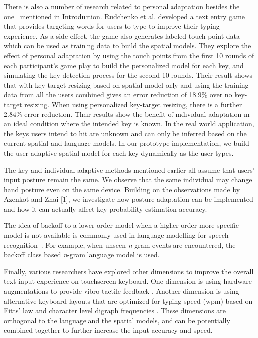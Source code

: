\documentclass{sigchi}
\begin{document}
There is also a number of research related to personal adaptation besides the one~\cite{Findlater:2012} mentioned in Introduction. 
Rudchenko et al. \cite{Rudchenko:2011}
developed a text entry game that provides 
targeting words for users to type to improve their typing experience. As a side effect,
the game also generates labeled touch point data which can be used as
training data to build the spatial models. They explore the effect of personal adaptation
by using the touch points from the first 10 rounds of each 
participant's game play to build the personalized model for each key, and simulating the key detection
process for the second 10 rounds. Their result shows that with key-target resizing based on
spatial model only and using the training data from all the users combined
gives an error reduction of 18.9\% over no key-target resizing. When using personalized
key-target resizing, there is a further 2.84\% error reduction.
Their results show the benefit of individual adaptation in an ideal condition where the 
intended key is known. In the real world application, the keys users intend to hit are unknown and can only be inferred based on the current spatial and language models. In our prototype implementation, we build the user adaptive spatial model for each key dynamically as the user types. 

The key and individual adaptive methods mentioned earlier all assume that users' input posture
remain the same. We observe that the same individual may change hand posture even on the same device. Building on the observations made by Azenkot and Zhai [1], we investigate how posture adaptation can be implemented and how it can actually affect key probability estimation accuracy.

The idea of backoff to a lower order model when a higher order more specific model is not available is commonly used in language modelling for speech recognition~\cite{Zitouni:2007}. For example, when unseen \textit{n}-gram events are encountered, the backoff class based \textit{n}-gram language model is used.

Finally, various researchers have explored other dimensions to improve the overall
text input experience on touchscreen keyboard. One dimension is using hardware
augmentations to provide vibro-tactile feedback \cite{Brewster:2007, Hoggan:2008}. 
Another dimension is using alternative keyboard layouts that are optimized for typing speed (wpm)
based on Fitts' law and character level digraph frequencies \cite{Zhai:2000, MacKenzie:1999}.
These dimensions are orthogonal to the language and the spatial models, and can be potentially 
combined together to further increase the input accuracy and speed.
\end{document}

